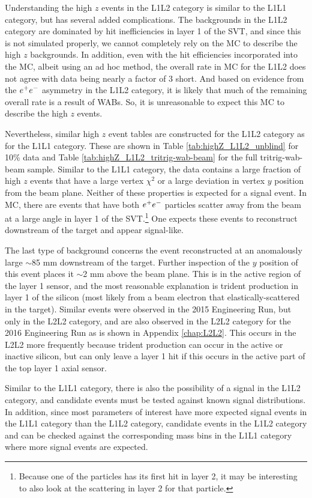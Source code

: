Understanding the high $z$ events in the L1L2 category is similar to the L1L1 category, but has several added complications. The backgrounds in the L1L2 category are dominated by hit inefficiencies in layer 1 of the SVT, and since this is not simulated properly, we cannot completely rely on the MC to describe the high $z$ backgrounds. In addition, even with the hit efficiencies incorporated into the MC, albeit using an ad hoc method, the overall rate in MC for the L1L2 does not agree with data being nearly a factor of 3 short. And based on evidence from the $e^{+}e^{-}$ asymmetry in the L1L2 category, it is likely that much of the remaining overall rate is a result of WABs. So, it is unreasonable to expect this MC to describe the high $z$ events.

Nevertheless, similar high $z$ event tables are constructed for the L1L2 category as for the L1L1 category. These are shown in Table \ref{tab:highZ_L1L2_unblind} for 10\% data and Table \ref{tab:highZ_L1L2_tritrig-wab-beam} for the full tritrig-wab-beam sample. Similar to the L1L1 category, the data contains a large fraction of high $z$ events that have a large vertex $\chi^2$ or a large deviation in vertex $y$ position from the beam plane. Neither of these properties is expected for a signal event. In MC, there are events that have both $e^{+}e^{-}$ particles scatter away from the beam at a large angle in layer 1 of the SVT.\footnote{Because one of the particles has its first hit in layer 2, it may be interesting to also look at the scattering in layer 2 for that particle.} One expects these events to reconstruct downstream of the target and appear signal-like.

The last type of background concerns the event reconstructed at an anomalously large $\sim$85 mm downstream of the target. Further inspection of the $y$ position of this event places it $\sim$2 mm above the beam plane. This is in the active region of the layer 1 sensor, and the most reasonable explanation is trident production in layer 1 of the silicon (most likely from a beam electron that elastically-scattered in the target). Similar events were observed in the 2015 Engineering Run, but only in the L2L2 category, and are also observed in the L2L2 category for the 2016 Engineering Run as is shown in Appendix \ref{chap:L2L2}. This occurs in the L2L2 more frequently because trident production can occur in the active or inactive silicon, but can only leave a layer 1 hit if this occurs in the active part of the top layer 1 axial sensor. 

Similar to the L1L1 category, there is also the possibility of a signal in the L1L2 category, and candidate events must be tested against known signal distributions. In addition, since most parameters of interest have more expected signal events in the L1L1 category than the L1L2 category, candidate events in the L1L2 category and can be checked against the corresponding mass bins in the L1L1 category where more signal events are expected.

